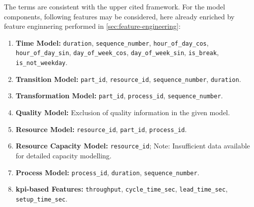 The terms are consistent with the upper cited framework. For the model components, following features may be considered, here already enriched by feature enginnering performed in \autoref{sec:feature-engineering}:

\begin{enumerate}
  \item \textbf{Time Model:} \texttt{duration}, \texttt{sequence\_number}, \texttt{hour\_of\_day\_cos}, \texttt{hour\_of\_day\_sin}, \texttt{day\_of\_week\_cos}, \texttt{day\_of\_week\_sin}, \texttt{is\_break}, \texttt{is\_not\_weekday}.

  \item \textbf{Transition Model:} \texttt{part\_id}, \texttt{resource\_id}, \texttt{sequence\_number}, \texttt{duration}.

  \item \textbf{Transformation Model:} \texttt{part\_id}, \texttt{process\_id}, \texttt{sequence\_number}.

  \item \textbf{Quality Model:} Exclusion of quality information in the given model.

  \item \textbf{Resource Model:} \texttt{resource\_id}, \texttt{part\_id}, \texttt{process\_id}.

  \item \textbf{Resource Capacity Model:} \texttt{resource\_id}; Note: Insufficient data available for detailed capacity modelling.

  \item \textbf{Process Model:} \texttt{process\_id}, \texttt{duration}, \texttt{sequence\_number}.

  \item \textbf{\gls{kpi}-based Features:} \texttt{throughput}, \texttt{cycle\_time\_sec}, \texttt{lead\_time\_sec}, \texttt{setup\_time\_sec}.
\end{enumerate}

